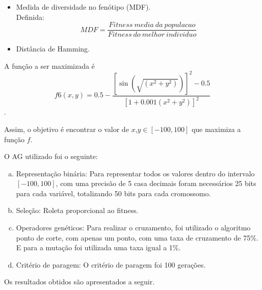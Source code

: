 \documentclass[12pt]{article}
\begin{document}
\begin{itemize}
	\item Medida de diversidade no fenótipo (MDF).\\
		Definida:
		\begin{equation}
			MDF = \frac{Fitness\ media\ da\ populacao}{Fitness\ do\ melhor\ individuo}
		\end{equation}
	\item Distância de Hamming.
\end{itemize}

A função a ser maximizada é
$$f6(x,y) = 0.5 - \frac{[\sin(\sqrt{(x^2 + y^2)})]^2 - 0.5}{[1 + 0.001(x^2 + y^2)]^2}$$.


Assim, o objetivo é encontrar o valor de $x$,$y \in [-100,100]$ que maximiza a função $f$.

O AG utilizado foi o seguinte:

\begin{enumerate}[(a)]
	\item Representação binária: Para representar todos os valores dentro do intervalo $[-100,100]$, com uma precisão
		de 5 casa decimais foram necessários 25 bits para cada variável, totalizando 50 bits para cada cromossomo.

	\item Seleção: Roleta proporcional ao fitness.

	\item Operadores genéticos: Para realizar o cruzamento, foi utilizado o algoritmo ponto de corte, com apenas um ponto,
		com uma taxa de cruzamento de 75\%. E para a mutação foi utilizada uma taxa igual a 1\%.
	\item Critério de paragem: O critério de paragem foi 100 gerações.
\end{enumerate}

Os resultados obtidos são apresentados a seguir.
\end{document}
